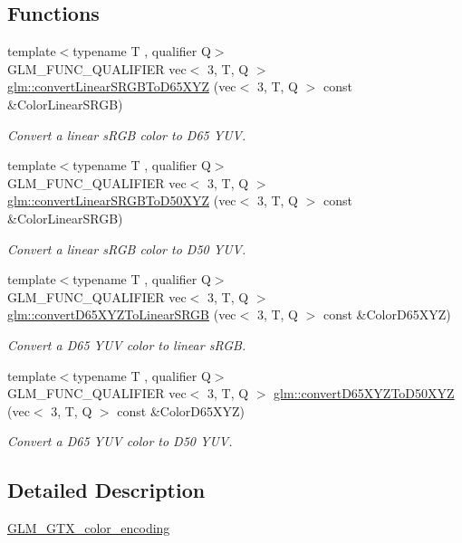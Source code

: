 \subsection*{Functions}
\begin{DoxyCompactItemize}
\item 
{\footnotesize template$<$typename T , qualifier Q$>$ }\\G\+L\+M\+\_\+\+F\+U\+N\+C\+\_\+\+Q\+U\+A\+L\+I\+F\+I\+ER vec$<$ 3, T, Q $>$ \hyperlink{group__gtx__color__encoding_gaf9e130d9d4ccf51cc99317de7449f369}{glm\+::convert\+Linear\+S\+R\+G\+B\+To\+D65\+X\+YZ} (vec$<$ 3, T, Q $>$ const \&Color\+Linear\+S\+R\+GB)
\begin{DoxyCompactList}\small\item\em Convert a linear s\+R\+GB color to D65 Y\+UV. \end{DoxyCompactList}\item 
{\footnotesize template$<$typename T , qualifier Q$>$ }\\G\+L\+M\+\_\+\+F\+U\+N\+C\+\_\+\+Q\+U\+A\+L\+I\+F\+I\+ER vec$<$ 3, T, Q $>$ \hyperlink{group__gtx__color__encoding_ga1522ba180e3d83d554a734056da031f9}{glm\+::convert\+Linear\+S\+R\+G\+B\+To\+D50\+X\+YZ} (vec$<$ 3, T, Q $>$ const \&Color\+Linear\+S\+R\+GB)
\begin{DoxyCompactList}\small\item\em Convert a linear s\+R\+GB color to D50 Y\+UV. \end{DoxyCompactList}\item 
{\footnotesize template$<$typename T , qualifier Q$>$ }\\G\+L\+M\+\_\+\+F\+U\+N\+C\+\_\+\+Q\+U\+A\+L\+I\+F\+I\+ER vec$<$ 3, T, Q $>$ \hyperlink{group__gtx__color__encoding_ga5265386fc3ac29e4c580d37ed470859c}{glm\+::convert\+D65\+X\+Y\+Z\+To\+Linear\+S\+R\+GB} (vec$<$ 3, T, Q $>$ const \&Color\+D65\+X\+YZ)
\begin{DoxyCompactList}\small\item\em Convert a D65 Y\+UV color to linear s\+R\+GB. \end{DoxyCompactList}\item 
{\footnotesize template$<$typename T , qualifier Q$>$ }\\G\+L\+M\+\_\+\+F\+U\+N\+C\+\_\+\+Q\+U\+A\+L\+I\+F\+I\+ER vec$<$ 3, T, Q $>$ \hyperlink{group__gtx__color__encoding_gad12f4f65022b2c80e33fcba2ced0dc48}{glm\+::convert\+D65\+X\+Y\+Z\+To\+D50\+X\+YZ} (vec$<$ 3, T, Q $>$ const \&Color\+D65\+X\+YZ)
\begin{DoxyCompactList}\small\item\em Convert a D65 Y\+UV color to D50 Y\+UV. \end{DoxyCompactList}\end{DoxyCompactItemize}


\subsection{Detailed Description}
\hyperlink{group__gtx__color__encoding}{G\+L\+M\+\_\+\+G\+T\+X\+\_\+color\+\_\+encoding} 